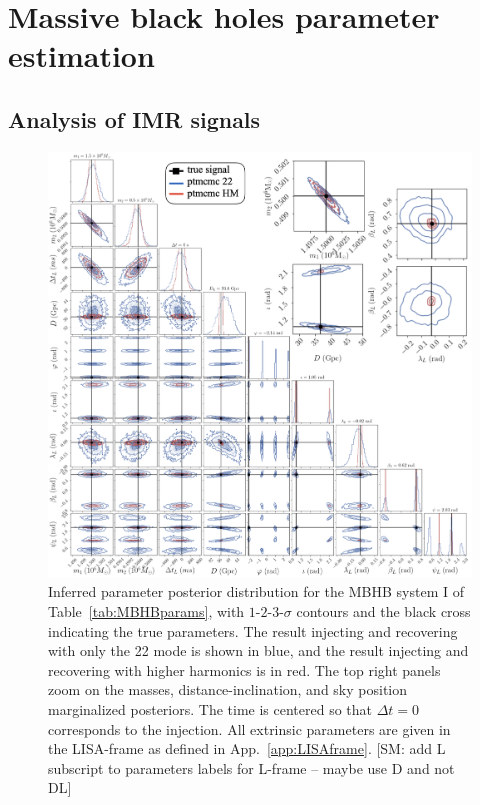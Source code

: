 \documentclass[aps,showpacs,twocolumn,prd,superscriptaddress,nofootinbib]{revtex4-1}
\newcommand{\SM}[1]{{\color{Blue} [SM: #1]}}
\begin{document}

\section{Massive black holes parameter estimation}
\label{sec:SMBHPE}

\subsection{Analysis of IMR signals}
\label{subsec:SMBHPEfull}

\begin{figure}
  \centering
  \includegraphics[width=.98\linewidth]{../plots/corner_smbh_case0_ptmcmc_22_hm_withzoom.png}
  \caption{Inferred parameter posterior distribution for the MBHB system I of Table~\ref{tab:MBHBparams}, with $1$-$2$-$3$-$\sigma$ contours and the black cross indicating the true parameters. The result injecting and recovering with only the 22 mode is shown in blue, and the result injecting and recovering with higher harmonics is in red. The top right panels zoom on the masses, distance-inclination, and sky position marginalized posteriors. The time is centered so that $\Delta t=0$ corresponds to the injection. All extrinsic parameters are given in the LISA-frame as defined in App.~\ref{app:LISAframe}. \SM{add L subscript to parameters labels for L-frame -- maybe use D and not DL}}
  \label{fig:PEsmbh22hmCase0}
\end{figure}
\end{document}
